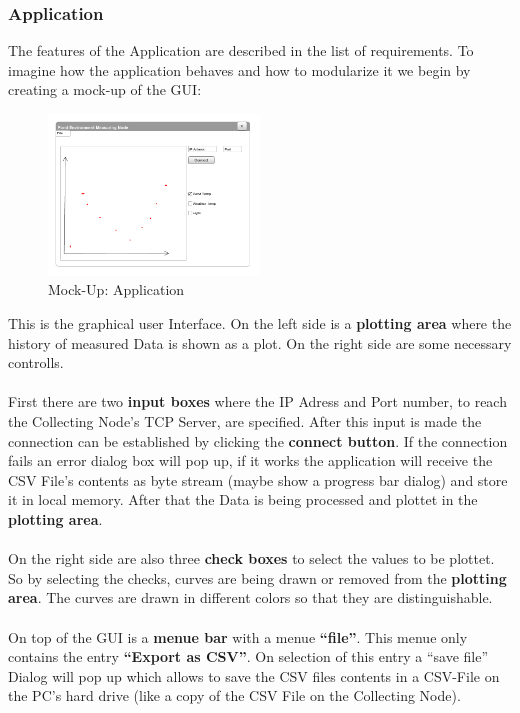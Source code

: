 \documentclass[
	11pt,
	a4paper
]{article}%
\begin{document}
\subsubsection{Application}
The features of the Application are described in the list of requirements. To imagine how the application behaves and how to modularize it we begin by creating a mock-up of the GUI:
\begin{figure}[h!]
  \caption{Mock-Up: Application}
  \centering
    \includegraphics[width=0.5\textwidth]{../Images/Application.png}
\end{figure}
This is the graphical user Interface. On the left side is a \textbf{plotting area} where the history of measured Data is shown as a plot. On the right side are some necessary controlls.
\\\\
First there are two \textbf{input boxes} where the IP Adress and Port number, to reach the Collecting Node's TCP Server, are specified. After this input is made the connection can be established by clicking the \textbf{connect button}. If the connection fails an error dialog box will pop up, if it works the application will receive the CSV File's contents as byte stream (maybe show a progress bar dialog) and store it in local memory. After that the Data is being processed and plottet in the \textbf{plotting area}.
\\\\
On the right side are also three \textbf{check boxes} to select the values to be plottet. So by selecting the checks, curves are being drawn or removed from the \textbf{plotting area}. The curves are drawn in different colors so that they are distinguishable.
\\\\
On top of the GUI is a \textbf{menue bar} with a menue \textbf{“file”}. This menue only contains the entry \textbf{“Export as CSV”}. On selection of this entry a “save file” Dialog will pop up which allows to save the CSV files contents in a CSV-File on the PC's hard drive (like a copy of the CSV File on the Collecting Node).
\end{document}
